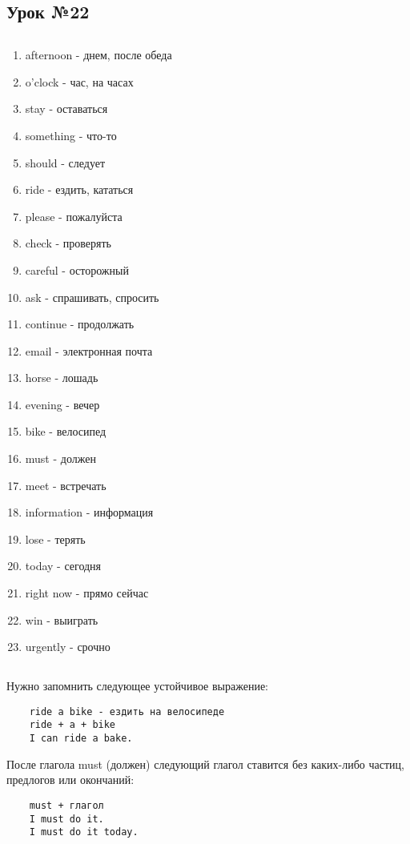 \subsection{Урок №22}

\subsection*{}
\begin{multicols}{2}
    \begin{enumerate}\setlength{\itemsep}{0pt}
        \item afternoon - днем, после обеда
        \item o'clock - час, на часах
        \item stay - оставаться
        \item something - что-то
        \item should - следует
        \item ride - ездить, кататься
        \item please - пожалуйста
        \item check - проверять
        \item careful - осторожный
        \item ask - спрашивать, спросить
        \item continue - продолжать
        \item email - электронная почта
        \item horse - лошадь
        \item evening - вечер
        \item bike - велосипед
        \item must - должен
        \item meet - встречать
        \item information - информация
        \item lose - терять
        \item today - сегодня
        \item right now - прямо сейчас
        \item win - выиграть
        \item urgently - срочно
    \end{enumerate}
\end{multicols}

\subsection*{}
Нужно запомнить следующее устойчивое выражение:
\begin{verbatim}
    ride a bike - ездить на велосипеде
    ride + a + bike
    I can ride a bake.
\end{verbatim}

После глагола must (должен) следующий глагол ставится без каких-либо частиц, предлогов или окончаний:
\begin{verbatim}
    must + глагол
    I must do it.
    I must do it today.
\end{verbatim}